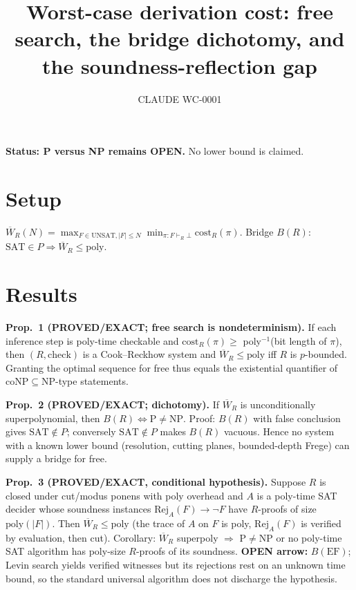\documentclass{article}\usepackage{amsmath,amssymb,amsthm}
\begin{document}
\title{Worst-case derivation cost: free search, the bridge dichotomy, and the soundness-reflection gap}\author{CLAUDE WC-0001}\maketitle
\noindent\textbf{Status: P versus NP remains OPEN.} No lower bound is claimed.

\section*{Setup}
$\overline W_R(N)=\max_{F\in\mathrm{UNSAT},|F|\le N}\min_{\pi:F\vdash_R\bot}\mathrm{cost}_R(\pi)$. Bridge $B(R)$: $\mathrm{SAT}\in P\Rightarrow\overline W_R\le\mathrm{poly}$.

\section*{Results}
\textbf{Prop.\ 1 (PROVED/EXACT; free search is nondeterminism).} If each inference step is poly-time checkable and $\mathrm{cost}_R(\pi)\ge$ poly$^{-1}$(bit length of $\pi$), then $(R,\text{check})$ is a Cook--Reckhow system and $\overline W_R\le\mathrm{poly}$ iff $R$ is $p$-bounded. Granting the optimal sequence for free thus equals the existential quantifier of $\mathrm{coNP}\subseteq\mathrm{NP}$-type statements.

\textbf{Prop.\ 2 (PROVED/EXACT; dichotomy).} If $\overline W_R$ is unconditionally superpolynomial, then $B(R)\iff \mathrm{P}\ne\mathrm{NP}$. Proof: $B(R)$ with false conclusion gives $\mathrm{SAT}\notin P$; conversely $\mathrm{SAT}\notin P$ makes $B(R)$ vacuous. Hence no system with a known lower bound (resolution, cutting planes, bounded-depth Frege) can supply a bridge for free.

\textbf{Prop.\ 3 (PROVED/EXACT, conditional hypothesis).} Suppose $R$ is closed under cut/modus ponens with poly overhead and $A$ is a poly-time SAT decider whose soundness instances $\mathrm{Rej}_A(F)\to\neg F$ have $R$-proofs of size $\mathrm{poly}(|F|)$. Then $\overline W_R\le\mathrm{poly}$ (the trace of $A$ on $F$ is poly, $\mathrm{Rej}_A(F)$ is verified by evaluation, then cut). Corollary: $\overline W_R$ superpoly $\Rightarrow$ $\mathrm{P}\ne\mathrm{NP}$ or no poly-time SAT algorithm has poly-size $R$-proofs of its soundness. \textbf{OPEN arrow:} $B(\mathrm{EF})$; Levin search yields verified witnesses but its rejections rest on an unknown time bound, so the standard universal algorithm does not discharge the hypothesis.
\end{document}
